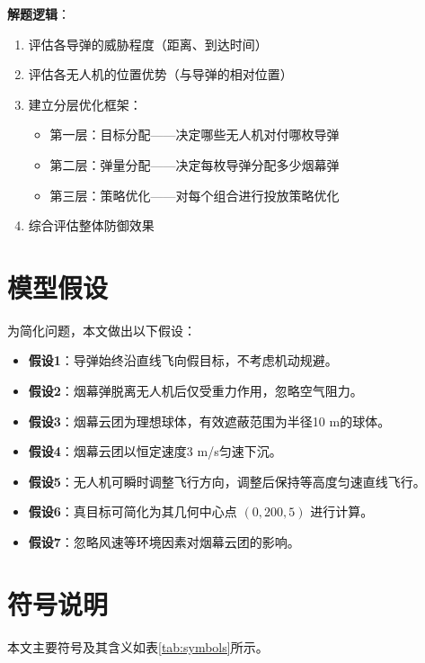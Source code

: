 \documentclass[12pt,a4paper]{article}
\begin{document}
\textbf{解题逻辑}：
\begin{enumerate}
    \item 评估各导弹的威胁程度（距离、到达时间）
    \item 评估各无人机的位置优势（与导弹的相对位置）
    \item 建立分层优化框架：
    \begin{itemize}
        \item 第一层：目标分配——决定哪些无人机对付哪枚导弹
        \item 第二层：弹量分配——决定每枚导弹分配多少烟幕弹
        \item 第三层：策略优化——对每个组合进行投放策略优化
    \end{itemize}
    \item 综合评估整体防御效果
\end{enumerate}

\section{模型假设}

为简化问题，本文做出以下假设：

\begin{itemize}
    \item \textbf{假设1}：导弹始终沿直线飞向假目标，不考虑机动规避。
    \item \textbf{假设2}：烟幕弹脱离无人机后仅受重力作用，忽略空气阻力。
    \item \textbf{假设3}：烟幕云团为理想球体，有效遮蔽范围为半径10 m的球体。
    \item \textbf{假设4}：烟幕云团以恒定速度3 m/s匀速下沉。
    \item \textbf{假设5}：无人机可瞬时调整飞行方向，调整后保持等高度匀速直线飞行。
    \item \textbf{假设6}：真目标可简化为其几何中心点 $(0, 200, 5)$ 进行计算。
    \item \textbf{假设7}：忽略风速等环境因素对烟幕云团的影响。
\end{itemize}

\section{符号说明}

本文主要符号及其含义如表\ref{tab:symbols}所示。
\end{document}
